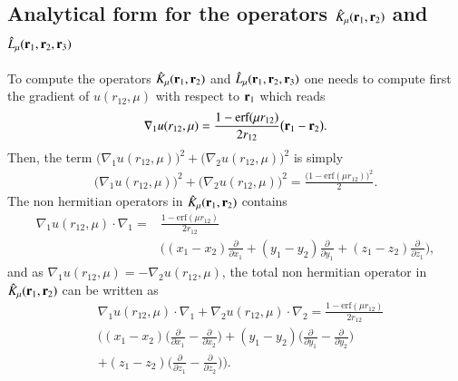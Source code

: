 \documentclass[aip,jcp,reprint,noshowkeys,superscriptaddress]{revtex4-1}
\newcommand{\deriv}[3]{\frac{\partial^{#3} #1}{\partial {#2}^{#3}}}
\newcommand{\br}[0]{{\bf {r}}}
\newcommand{\bri}[1]{{\bf r}_{#1}}
\begin{document}
\subsection{Analytical form for the operators $\hat{K}_\mu(\bri{1},\bri{2}) $ and $\hat{L}_\mu(\bri{1},\bri{2},\bri{3})$ }
To compute the operators $\hat{K}_\mu(\bri{1},\bri{2})$ and $\hat{L}_\mu(\bri{1},\bri{2},\bri{3}) $ one needs to compute first the gradient of $u(r_{12},\mu)$ with respect to $\bri{1}$ which reads 
\begin{equation}
 \label{eq:nabla_u}
 \begin{aligned}
 \nabla_1 u(r_{12},\mu) = \frac{1 - \text{erf}(\mu r_{12})}{2 r_{12}} \big( \br{}_1 - \br{}_2 \big).
 \end{aligned}
\end{equation}
Then, the term $\big(\nabla_1 u(r_{12},\mu) \big) ^2 + \big(\nabla_2 u(r_{12},\mu) \big) ^2$ is simply 
\begin{equation}
 \begin{aligned}
 \big(\nabla_1 u(r_{12},\mu) \big) ^2 + \big(\nabla_2 u(r_{12},\mu) \big) ^2 = \frac{\bigg(1 - \text{erf}(\mu r_{12}) \bigg)^2}{2}.
 \end{aligned}
\end{equation}
The non hermitian operators in $\hat{K}_\mu(\bri{1},\bri{2})$ contains 
\begin{equation}
 \begin{aligned}
 \nabla_1 u(r_{12},\mu) \cdot \nabla_1  = &\frac{1 - \text{erf}(\mu r_{12})}{2 r_{12}} \\ 
                                          &\bigg( (x_1 - x_2) \deriv{}{x_1}{} + (y_1 - y_2) \deriv{}{y_1}{} + (z_1 - z_2) \deriv{}{z_1}{}\bigg),
 \end{aligned}
\end{equation}
and as $\nabla_1 u(r_{12},\mu) = - \nabla_2 u(r_{12},\mu)$,   
the total non hermitian operator in $\hat{K}_\mu(\bri{1},\bri{2})$ can be written as 
\begin{equation}
 \begin{aligned}
 \label{def_non_hermit}
& \nabla_1 u(r_{12},\mu) \cdot \nabla_1 + \nabla_2 u(r_{12},\mu) \cdot \nabla_2 = \frac{1 - \text{erf}(\mu r_{12})}{2 r_{12}} \\
& \bigg( (x_1 - x_2) \big( \deriv{}{x_1}{} - \deriv{}{x_2}{} \big) +
         (y_1 - y_2) \big( \deriv{}{y_1}{} - \deriv{}{y_2}{} \big)  \\
&  +      (z_1 - z_2) \big( \deriv{}{z_1}{} - \deriv{}{z_2}{} \big)\bigg).
 \end{aligned}
\end{equation}
\end{document}
